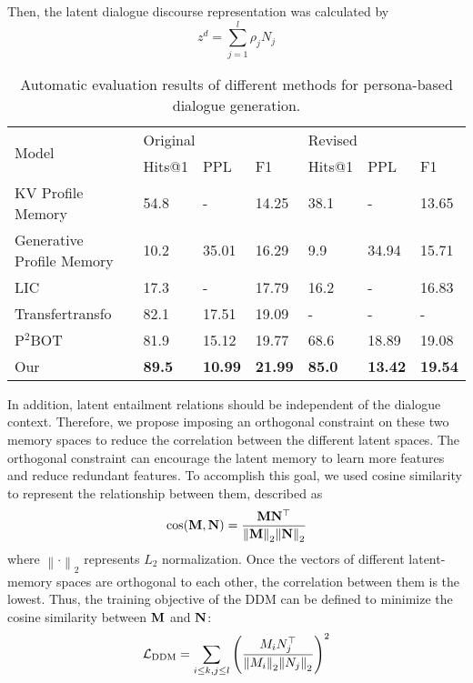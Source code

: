 \documentclass[letterpaper]{article} \usepackage{aaai23}  \usepackage{times}  \usepackage{helvet}  \usepackage{courier}  \usepackage[hyphens]{url}  \usepackage{graphicx} \urlstyle{rm} \def\UrlFont{\rm}  \usepackage{natbib}  \usepackage{caption} \frenchspacing  \setlength{\pdfpagewidth}{8.5in}  \setlength{\pdfpageheight}{11in}  \usepackage{algorithm}
\begin{document}
Then, the latent dialogue discourse representation was calculated by
\begin{equation}
{z^d} = \sum\limits_{j = 1}^l {{\rho _j}{N_j}}
\label{eq10}
\end{equation}
\begin{table*}[t]
  \centering
    \begin{tabular}{lllllll}
    \toprule
    \multirow{2}[4]{*}{Model} & \multicolumn{3}{p{12.57em}}{Original} & \multicolumn{3}{p{12.57em}}{Revised} \\
\cmidrule{2-7}    \multicolumn{1}{c}{} & \multicolumn{1}{p{4.19em}}{Hits@1} & \multicolumn{1}{p{4.19em}}{PPL} & \multicolumn{1}{p{4.19em}}{F1} & \multicolumn{1}{p{4.19em}}{Hits@1} & \multicolumn{1}{p{4.19em}}{PPL} & \multicolumn{1}{p{4.19em}}{F1} \\
    \midrule
    KV Profile Memory & 54.8  &  -    & 14.25 & 38.1  &  -    & 13.65 \\
Generative Profile Memory & 10.2  & 35.01 & 16.29 & 9.9   & 34.94 & 15.71 \\
LIC   & 17.3  &   -   & 17.79 & 16.2  &   -   & 16.83 \\
Transfertransfo & 82.1  & 17.51 & 19.09 &   -   &   -   &  - \\
P$^2$BOT & 81.9  & 15.12 & 19.77 & 68.6  & 18.89 & 19.08 \\
Our   & \textbf{89.5} & \textbf{10.99} & \textbf{21.99} & \textbf{85.0} & \textbf{13.42} & \textbf{19.54} \\
    \bottomrule
    \end{tabular}
\caption{Automatic evaluation results of different methods for persona-based dialogue generation.}
\label{table1}
\end{table*}

In addition, latent entailment relations should be independent of the dialogue context. Therefore, we propose imposing an orthogonal constraint on these two memory spaces to reduce the correlation between the different latent spaces. The orthogonal constraint can encourage the latent memory to learn more features and reduce redundant features. To accomplish this goal, we used cosine similarity to represent the relationship between them, described as
\begin{equation}
\cos ({\bf{M}},{\bf{N}}) = \frac{{{\bf{M}}{{\bf{N}}^ \top }}}{{{{\left\| {\bf{M}} \right\|}_2}{{\left\| {\bf{N}} \right\|}_2}}}
\label{eq11}
\end{equation}
where ${\left\|  \cdot  \right\|_2}$ represents ${L_2}$ normalization. Once the vectors of different latent-memory spaces are orthogonal to each other, the correlation between them is the lowest. Thus, the training objective of the DDM can be defined to minimize the cosine similarity between ${\bf{M}}$ and ${\bf{N}}$: 
\begin{equation}
{{\cal L}_{{\rm{DDM}}}} = {\sum\limits_{i \le k,j \le l} {\left( {\frac{{{M_i}N_j^ \top }}{{{{\left\| {{M_i}} \right\|}_2}{{\left\| {{N_j}} \right\|}_2}}}} \right)} ^2}
\label{eq12}
\end{equation}
\end{document}
